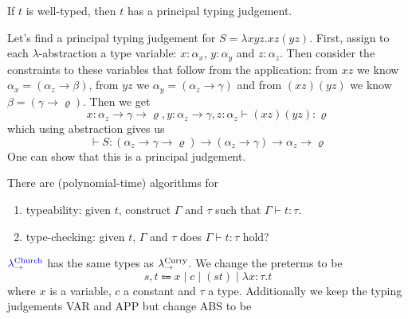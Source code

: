 \begin{boxthm}
    If $t$ is well-typed, then $t$ has a principal typing judgement.
\end{boxthm}

\begin{example}
    Let's find a principal typing judgement for $S = \lambda x y z. x z (y z)$.
    First, assign to each $\lambda$-abstraction a type variable: $x : \alpha_x$, $y : \alpha_y$ and $z : \alpha_z$.
    Then consider the constraints to these variables that follow from the application: from $xz$ we know $\alpha_x = (\alpha_z \to \beta)$, from $yz$ we $\alpha_y = (\alpha_z \to \gamma)$ and from $(xz)(yz)$ we know $\beta =(\gamma  \to \varrho)$.
    Then we get
    \begin{equation*}
        x : \alpha_z \to \gamma \to \varrho, y : \alpha_z \to \gamma, z : \alpha_z \vdash (xz)(yz) : \varrho
    \end{equation*}
    which using abstraction gives us
    \begin{equation*}
        \vdash S : (\alpha_z \to \gamma \to \varrho) \to (\alpha_z \to \gamma) \to \alpha_z \to \varrho
    \end{equation*}
    One can show that this is a principal judgement.
\end{example}

\begin{boxthm}
    There are (polynomial-time) algorithms for
    \begin{enumerate}
        \item typeability: given $t$, construct $\Gamma$ and $\tau$ such that $\Gamma \vdash t : \tau$.
        \item type-checking: given $t$, $\Gamma$ and $\tau$ does $\Gamma \vdash t : \tau$ hold?
    \end{enumerate}
\end{boxthm}

\begin{boxdefi}
    $\alert{\lamchu}$ has the same types as $\lamcur$.
    We change the \alert{preterms} to be
    \begin{equation*}
        s, t \Coloneqq x \mid c \mid (st) \mid \lambda x : \tau .t
    \end{equation*}
    where $x$ is a variable, $c$ a constant and $\tau$ a type.
    Additionally we keep the \alert{typing judgements} VAR and APP but change ABS to be
    \begin{prooftree}
    \end{prooftree}
\end{boxdefi}


